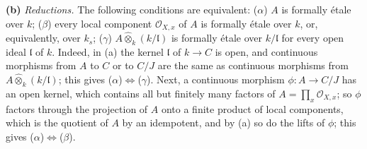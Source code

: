 \smallskip
\noindent\textbf{(b)}
\label{sga3:VIIB:1.6.B}
\emph{Reductions.} The following conditions are equivalent:
\textup{(\(\alpha\))} \(A\) is formally étale over \(k\);
\textup{(\(\beta\))} every local component \(\mathcal O_{X,x}\) of
\(A\) is formally étale over \(k\), or, equivalently, over \(k_s\);
\textup{(\(\gamma\))} \(A\widehat\otimes_k(k/\mathfrak l)\) is
formally étale over \(k/\mathfrak l\) for every open ideal
\(\mathfrak l\) of \(k\). Indeed, in \textup{(a)} the kernel
\(\mathfrak l\) of \(k\to C\) is open, and continuous morphisms from
\(A\) to \(C\) or to \(C/J\) are the same as continuous morphisms from
\(A\widehat\otimes_k(k/\mathfrak l)\); this gives
\textup{(\(\alpha\))}\(\Leftrightarrow\)\textup{(\(\gamma\))}. Next, a
continuous morphism \(\phi:A\to C/J\) has an open kernel, which
contains all but finitely many factors of
\(A=\prod_x\mathcal O_{X,x}\); so \(\phi\) factors through the
projection of \(A\) onto a finite product of local components, which
is the quotient of \(A\) by an idempotent, and by \textup{(a)} so do the
lifts of \(\phi\); this gives
\textup{(\(\alpha\))}\(\Leftrightarrow\)\textup{(\(\beta\))}.

